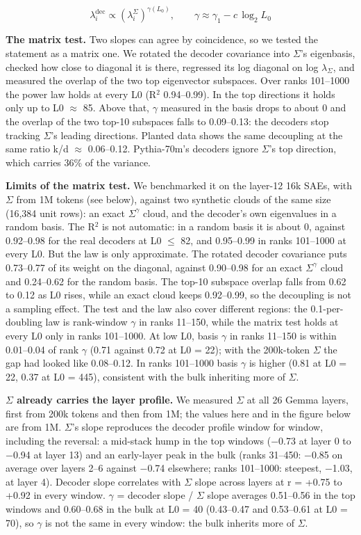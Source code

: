 \documentclass[11pt]{article}
\begin{document}
\[
\lambda_i^{\mathrm{dec}} \propto \left(\lambda_i^{\Sigma}\right)^{\gamma(L_0)}, \qquad \gamma \approx \gamma_1 - c \, \log_2 L_0
\]

\textbf{The matrix test.} Two slopes can agree by coincidence, so we tested the statement as a matrix one. We rotated the decoder covariance into $\Sigma$'s eigenbasis, checked how close to diagonal it is there, regressed its log diagonal on log $\lambda_\Sigma$, and measured the overlap of the two top eigenvector subspaces. Over ranks 101--1000 the power law holds at every L0 (R$^2$ 0.94--0.99). In the top directions it holds only up to L0 $\approx$ 85. Above that, $\gamma$ measured in the basis drops to about 0 and the overlap of the two top-10 subspaces falls to 0.09--0.13: the decoders stop tracking $\Sigma$'s leading directions. Planted data shows the same decoupling at the same ratio k/d $\approx$ 0.06--0.12. Pythia-70m's decoders ignore $\Sigma$'s top direction, which carries 36\% of the variance.

\textbf{Limits of the matrix test.} We benchmarked it on the layer-12 16k SAEs, with $\Sigma$ from 1M tokens (see below), against two synthetic clouds of the same size (16,384 unit rows): an exact $\Sigma^{\gamma}$ cloud, and the decoder's own eigenvalues in a random basis. The R$^2$ is not automatic: in a random basis it is about 0, against 0.92--0.98 for the real decoders at L0 $\le$ 82, and 0.95--0.99 in ranks 101--1000 at every L0. But the law is only approximate. The rotated decoder covariance puts 0.73--0.77 of its weight on the diagonal, against 0.90--0.98 for an exact $\Sigma^{\gamma}$ cloud and 0.24--0.62 for the random basis. The top-10 subspace overlap falls from 0.62 to 0.12 as L0 rises, while an exact cloud keeps 0.92--0.99, so the decoupling is not a sampling effect. The test and the law also cover different regions: the 0.1-per-doubling law is rank-window $\gamma$ in ranks 11--150, while the matrix test holds at every L0 only in ranks 101--1000. At low L0, basis $\gamma$ in ranks 11--150 is within 0.01--0.04 of rank $\gamma$ (0.71 against 0.72 at L0 = 22); with the 200k-token $\Sigma$ the gap had looked like 0.08--0.12. In ranks 101--1000 basis $\gamma$ is higher (0.81 at L0 = 22, 0.37 at L0 = 445), consistent with the bulk inheriting more of $\Sigma$.

\textbf{$\Sigma$ already carries the layer profile.} We measured $\Sigma$ at all 26 Gemma layers, first from 200k tokens and then from 1M; the values here and in the figure below are from 1M. $\Sigma$'s slope reproduces the decoder profile window for window, including the reversal: a mid-stack hump in the top windows ($-$0.73 at layer 0 to $-$0.94 at layer 13) and an early-layer peak in the bulk (ranks 31--450: $-$0.85 on average over layers 2--6 against $-$0.74 elsewhere; ranks 101--1000: steepest, $-$1.03, at layer 4). Decoder slope correlates with $\Sigma$ slope across layers at r = +0.75 to +0.92 in every window. $\gamma$ = decoder slope / $\Sigma$ slope averages 0.51--0.56 in the top windows and 0.60--0.68 in the bulk at L0 = 40 (0.43--0.47 and 0.53--0.61 at L0 = 70), so $\gamma$ is not the same in every window: the bulk inherits more of $\Sigma$.
\end{document}
